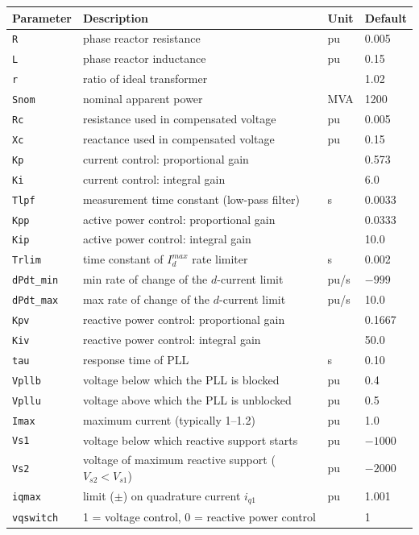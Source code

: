 \documentclass[11pt,a4paper]{article}
\begin{document}
\begin{center}
\begin{tabular}{llll}
\hline
Parameter & Description & Unit & Default \\
\hline
{\tt R}        & phase reactor resistance                        & pu   & 0.005  \\
{\tt L}        & phase reactor inductance                        & pu   & 0.15   \\
{\tt r}        & ratio of ideal transformer                      &      & 1.02   \\
{\tt Snom}     & nominal apparent power                          & MVA  & 1200   \\
{\tt Rc}       & resistance used in compensated voltage          & pu   & 0.005  \\
{\tt Xc}       & reactance used in compensated voltage           & pu   & 0.15   \\
{\tt Kp}       & current control: proportional gain              &      & 0.573  \\
{\tt Ki}       & current control: integral gain                  &      & 6.0    \\
{\tt Tlpf}     & measurement time constant (low-pass filter)     & s    & 0.0033 \\
{\tt Kpp}      & active power control: proportional gain         &      & 0.0333 \\
{\tt Kip}      & active power control: integral gain             &      & 10.0   \\
{\tt Trlim}    & time constant of $I_d^{max}$ rate limiter       & s    & 0.002  \\
{\tt dPdt\_min}& min rate of change of the $d$-current limit     & pu/s & $-999$ \\
{\tt dPdt\_max}& max rate of change of the $d$-current limit     & pu/s & 10.0   \\
{\tt Kpv}      & reactive power control: proportional gain       &      & 0.1667 \\
{\tt Kiv}      & reactive power control: integral gain           &      & 50.0   \\
{\tt tau}      & response time of PLL                            & s    & 0.10   \\
{\tt Vpllb}    & voltage below which the PLL is blocked          & pu   & 0.4    \\
{\tt Vpllu}    & voltage above which the PLL is unblocked        & pu   & 0.5    \\
{\tt Imax}     & maximum current (typically 1--1.2)              & pu   & 1.0    \\
{\tt Vs1}      & voltage below which reactive support starts     & pu   & $-1000$\\
{\tt Vs2}      & voltage of maximum reactive support ($V_{s2}<V_{s1}$) & pu & $-2000$\\
{\tt iqmax}    & limit ($\pm$) on quadrature current $i_{q1}$    & pu   & 1.001  \\
{\tt vqswitch} & 1 = voltage control, 0 = reactive power control &      & 1      \\
\hline
\end{tabular}
\end{center}
\end{document}

